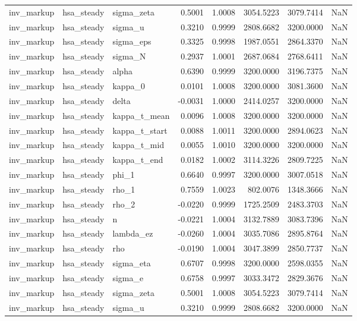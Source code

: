 \begin{tabular}{lllrrrrl}
inv\_markup & hsa\_steady & sigma\_zeta & 0.5001 & 1.0008 & 3054.5223 & 3079.7414 & NaN \\
inv\_markup & hsa\_steady & sigma\_u & 0.3210 & 0.9999 & 2808.6682 & 3200.0000 & NaN \\
inv\_markup & hsa\_steady & sigma\_eps & 0.3325 & 0.9998 & 1987.0551 & 2864.3370 & NaN \\
inv\_markup & hsa\_steady & sigma\_N & 0.2937 & 1.0001 & 2687.0684 & 2768.6411 & NaN \\
inv\_markup & hsa\_steady & alpha & 0.6390 & 0.9999 & 3200.0000 & 3196.7375 & NaN \\
inv\_markup & hsa\_steady & kappa\_0 & 0.0101 & 1.0008 & 3200.0000 & 3081.3600 & NaN \\
inv\_markup & hsa\_steady & delta & -0.0031 & 1.0000 & 2414.0257 & 3200.0000 & NaN \\
inv\_markup & hsa\_steady & kappa\_t\_mean & 0.0096 & 1.0008 & 3200.0000 & 3200.0000 & NaN \\
inv\_markup & hsa\_steady & kappa\_t\_start & 0.0088 & 1.0011 & 3200.0000 & 2894.0623 & NaN \\
inv\_markup & hsa\_steady & kappa\_t\_mid & 0.0055 & 1.0010 & 3200.0000 & 3200.0000 & NaN \\
inv\_markup & hsa\_steady & kappa\_t\_end & 0.0182 & 1.0002 & 3114.3226 & 2809.7225 & NaN \\
inv\_markup & hsa\_steady & phi\_1 & 0.6640 & 0.9997 & 3200.0000 & 3007.0518 & NaN \\
inv\_markup & hsa\_steady & rho\_1 & 0.7559 & 1.0023 & 802.0076 & 1348.3666 & NaN \\
inv\_markup & hsa\_steady & rho\_2 & -0.0220 & 0.9999 & 1725.2509 & 2483.3703 & NaN \\
inv\_markup & hsa\_steady & n & -0.0221 & 1.0004 & 3132.7889 & 3083.7396 & NaN \\
inv\_markup & hsa\_steady & lambda\_ez & -0.0260 & 1.0004 & 3035.7086 & 2895.8764 & NaN \\
inv\_markup & hsa\_steady & rho & -0.0190 & 1.0004 & 3047.3899 & 2850.7737 & NaN \\
inv\_markup & hsa\_steady & sigma\_eta & 0.6707 & 0.9998 & 3200.0000 & 2598.0355 & NaN \\
inv\_markup & hsa\_steady & sigma\_e & 0.6758 & 0.9997 & 3033.3472 & 2829.3676 & NaN \\
inv\_markup & hsa\_steady & sigma\_zeta & 0.5001 & 1.0008 & 3054.5223 & 3079.7414 & NaN \\
inv\_markup & hsa\_steady & sigma\_u & 0.3210 & 0.9999 & 2808.6682 & 3200.0000 & NaN \\

\end{tabular}
